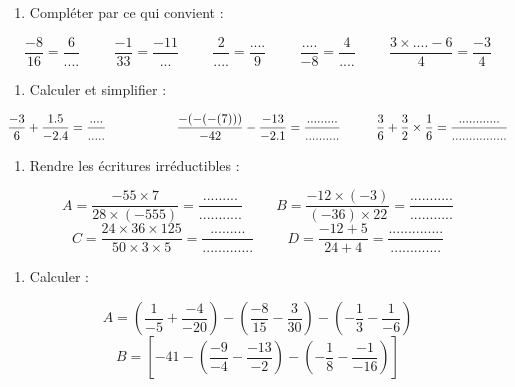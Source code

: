 \documentclass[a4paper,12pt]{article}
\begin{document}
\devoir[ds=true,prv=true,num=1 ,niv=2 , date=03/11/2022 ]

\begin{exo}[5]
\begin{enumerate}
\item Compléter par ce qui convient :
\end{enumerate}
\[\dfrac{-8}{16}=\dfrac{6}{....} \hspace{1cm}
\dfrac{-1}{33}=\dfrac{-11}{...}\hspace{1cm}
\dfrac{2}{....}=\dfrac{....}{9} \hspace{1cm}
\dfrac{....}{-8}=\dfrac{4}{....}\hspace{1cm}
\dfrac{3\times .... -6}{4}=\dfrac{-3}{4}\]

\end{exo}

\begin{exo}[4]
\begin{enumerate}
\item Calculer et simplifier :
\end{enumerate}
$\dfrac{-3}{6}+\dfrac{1.5}{-2.4}=\dfrac{....}{.....}\hspace{2cm}
\dfrac{-(-(-(7)))}{-42}-\dfrac{-13}{-2.1}=\dfrac{.........}{..........}\hspace*{1cm} \dfrac{3}{6}+\dfrac{3}{2}\times \dfrac{1}{6}=\dfrac{............}{................}$
\end{exo}


\begin{exo}[2]
\begin{enumerate}
\item Rendre les écritures irréductibles :
\end{enumerate}
\[A=\dfrac{-55\times7}{28\times(-555)} =\dfrac{.........}{...........}\hspace{1cm}
B=\dfrac{-12\times(-3)}{(-36)\times22}=\dfrac{...........}{...........}\]
\[C=\dfrac{24\times36\times125}{50\times3\times5}=\dfrac{.........}{.............} \hspace{1cm}
D=\dfrac{-12+5}{24+4}=\dfrac{..............}{.............}\]
\end{exo}

\begin{exo}[3]
\begin{enumerate}
\item Calculer :
\end{enumerate}
\begin{multicols}{2}
$$A=\left( \dfrac{1}{-5}+\dfrac{-4}{-20}\right) -\left(\dfrac{-8}{15}-\dfrac{3}{30}\right) -\left( -\dfrac{1}{3}-\dfrac{1}{-6} \right)$$
\columnbreak
$$B= \left[-41-\left( \dfrac{-9}{-4}-\dfrac{-13}{-2}\right) -\left( -\dfrac{1}{8}-\dfrac{-1}{-16} \right)\right]$$
\end{multicols}
\begin{multicols}{2}
\columnbreak
{}
\end{multicols}
\end{exo}
\end{document}
